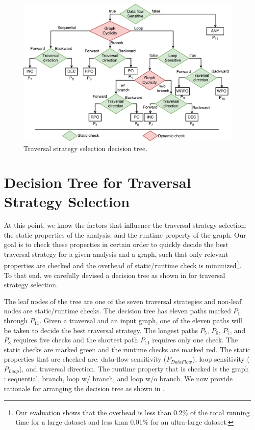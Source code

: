 \begin{figure}[ht!]
\centering
\includegraphics[width=0.8\linewidth]{figures/decision.pdf}
\caption{Traversal strategy selection decision tree.}
\label{fig:decision-diagram}
\end{figure}

\section{Decision Tree for Traversal Strategy Selection}
\label{sec:decision-tree}
At this point, we know the factors that influence the traversal strategy
selection: the static properties of the analysis, and the runtime property of
the graph. Our goal is to check these properties in certain order to quickly
decide the best traversal strategy for a given analysis and a graph, such that
only relevant properties are checked and the overhead of static/runtime check is
minimized\footnote{Our evaluation shows that the overhead is less than 0.2\% 
of the total running time for a large dataset and less than 0.01\% for an ultra-large dataset.}.
To that end, we carefully devised a decision tree as shown in
 for traversal strategy selection.

The leaf nodes of the tree are one of the seven traversal strategies
and non-leaf nodes are static/runtime checks. The decision tree has eleven paths
marked $P_1$ through $P_{11}$. Given a traversal and an input graph, one of the
eleven paths will be taken to decide the best traversal strategy. The longest
paths $P_5$, $P_6$, $P_7$, and $P_8$ requires five checks and the shortest path
$P_{11}$ requires only one check. The static checks are marked green and the
runtime checks are marked red. The static properties that are checked are:
data-flow sensitivity ($P_{DataFlow}$), loop sensitivity ($P_{Loop}$), and
traversal direction. The runtime property that is checked is the graph
\graphprop{}: sequential, branch, loop w/ branch, and loop w/o branch. We now
provide rationale for arranging the decision tree as shown in
.

